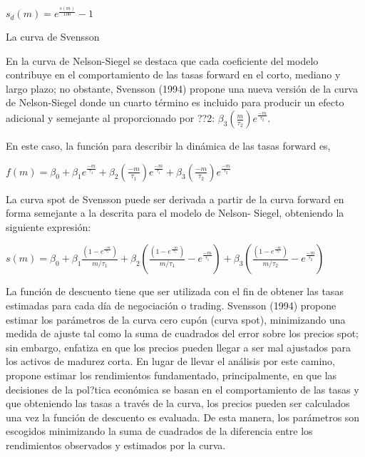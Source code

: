 \begin{center}
$\displaystyle{s_{d}(m) = e^{\frac{s(m)}{100}} - 1}$
\end{center}

La curva de Svensson

\hspace*{0.4 cm} En la curva de Nelson-Siegel se destaca que cada coeficiente del modelo
contribuye en el comportamiento de las tasas forward en el corto,
mediano y largo plazo; no obstante, Svensson (1994) propone una nueva
versi\'on de la curva de Nelson-Siegel donde un cuarto t\'ermino es incluido
para producir un efecto adicional y semejante al proporcionado por ??2:
$\beta_{3}(\frac{m}{\tau_{2}})e^{\frac{-m}{\tau_{2}}}$.

\hspace*{0.4 cm} En este caso, la funci\'on para describir la din\'amica de las tasas forward es,

\begin{center}
$\displaystyle{f(m) = \beta_{0} + \beta_{1} e^{\frac{-m}{\tau_{1}}} +\beta_{2} \left(\frac{-m}{\tau_{1}}\right)e^{\frac{-m}{\tau_{1}}} + \beta_{3}\left(\frac{-m}{\tau_{2}}\right)e^{\frac{-m}{\tau_{2}}} }$
\end{center}

\hspace*{0.4 cm} La curva spot de Svensson puede ser derivada a partir de la curva
forward en forma semejante a la descrita para el modelo de Nelson-
Siegel, obteniendo la siguiente expresi\'on:


\begin{center}
$\displaystyle{s(m) = \beta_{0}+ \beta_{1}\frac{\left(1-e^\frac{-m}{\tau_{1}}\right)}{m/\tau_{1}} + \beta_{2} \left(\frac{\left(1-e^\frac{-m}{\tau_{1}}\right)}{m/\tau_{1}} -  e^\frac{-m}{\tau_{1}}\right) + \beta_{3} \left(\frac{\left(1-e^\frac{-m}{\tau_{2}}\right)}{m/\tau_{2}} -  e^\frac{-m}{\tau_{2}}\right)}$
\end{center}

\hspace*{0.4 cm} La funci\'on de descuento tiene que ser utilizada con el fin de obtener las
tasas estimadas para cada d\'ia de negociaci\'on o trading. Svensson (1994)
propone estimar los par\'ametros de la curva cero cup\'on (curva spot),
minimizando una medida de ajuste tal como la suma de cuadrados del
error sobre los precios spot; sin embargo, enfatiza en que los precios
pueden llegar a ser mal ajustados para los activos de madurez corta. En
lugar de llevar el an\'alisis por este camino, propone estimar los
rendimientos fundamentado, principalmente, en que las decisiones de la
pol?tica econ\'omica se basan en el comportamiento de las tasas y que
obteniendo las tasas a trav\'es de la curva, los precios pueden ser
calculados una vez la funci\'on de descuento es evaluada. De esta manera,
los par\'ametros son escogidos minimizando la suma de cuadrados de la
diferencia entre los rendimientos observados y estimados por la curva.

